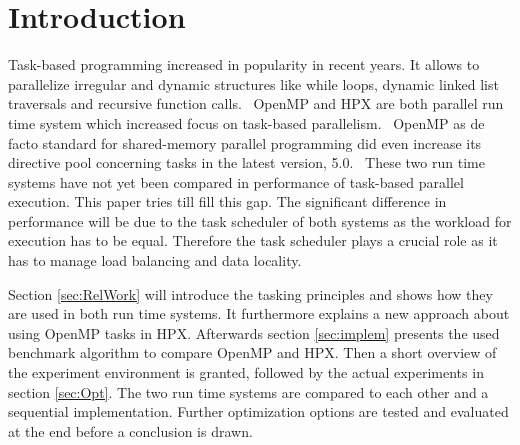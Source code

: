 \section{Introduction}
  Task-based programming increased in popularity in recent years.
  It allows to parallelize irregular and dynamic structures like while loops, dynamic linked list traversals and recursive function calls.~\cite{Ayguade.2009}
  OpenMP and HPX are both parallel run time system which increased focus on task-based parallelism.~\cite{TheSTEARGroup.2020}
  OpenMP as de facto standard for shared-memory parallel programming did even increase its directive pool concerning tasks in the latest version, 5.0.~\cite{Zhang.2192020}
  These two run time systems have not yet been compared in performance of task-based parallel execution.
  This paper tries till fill this gap.
  The significant difference in performance will be due to the task scheduler of both systems as the workload for execution has to be equal.
  Therefore the task scheduler plays a crucial role as it has to manage load balancing and data locality.~\cite{Qawasmeh.2014}
  
  Section \ref{sec:RelWork} will introduce the tasking principles and shows how they are used in both run time systems.
  It furthermore explains a new approach about using OpenMP tasks in HPX.
  Afterwards section \ref{sec:implem} presents the used benchmark algorithm to compare OpenMP and HPX.
  Then a short overview of the experiment environment is granted, followed by the actual experiments in section \ref{sec:Opt}.
  The two run time systems are compared to each other and a sequential implementation.
  Further optimization options are tested and evaluated at the end before a conclusion is drawn.